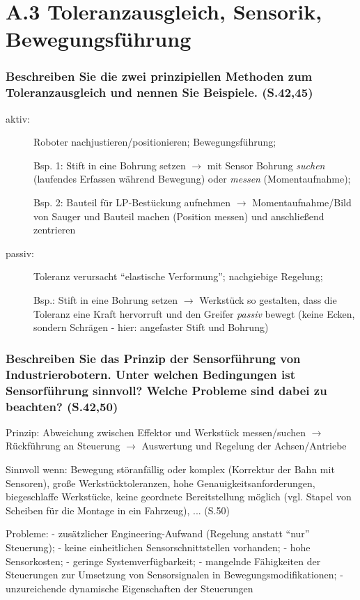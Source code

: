 \section{A.3 Toleranzausgleich, Sensorik, Bewegungsführung}

\subsubsection*{Beschreiben Sie die zwei prinzipiellen Methoden zum Toleranzausgleich und 
  nennen Sie Beispiele. (S.42,45)}
\begin{description}
\item[aktiv:] Roboter nachjustieren/positionieren; Bewegungsführung; 

  Bsp. 1: Stift in eine
  Bohrung setzen $\rightarrow$ mit Sensor Bohrung \emph{suchen} (laufendes Erfassen während 
  Bewegung) oder \emph{messen} (Momentaufnahme); 

  Bsp. 2: Bauteil für LP-Bestückung aufnehmen
  $\rightarrow$ Momentaufnahme/Bild von Sauger und Bauteil machen (Position messen) und 
  anschließend zentrieren
\item[passiv:] Toleranz verursacht ``elastische Verformung''; nachgiebige Regelung; 

  Bsp.: Stift in eine Bohrung
  setzen $\rightarrow$ Werkstück so gestalten, dass die Toleranz eine Kraft hervorruft und 
  den Greifer \emph{passiv} bewegt (keine Ecken, sondern Schrägen - hier: angefaster Stift
  und Bohrung)
\end{description}

\subsubsection*{Beschreiben Sie das Prinzip der Sensorführung von Industrierobotern. Unter
  welchen Bedingungen ist Sensorführung sinnvoll? Welche Probleme sind dabei zu beachten? 
  (S.42,50)}
Prinzip: Abweichung zwischen Effektor und Werkstück messen/suchen $\rightarrow$ Rückführung
an Steuerung $\rightarrow$ Auswertung und Regelung der Achsen/Antriebe

Sinnvoll wenn: Bewegung störanfällig oder komplex (Korrektur der Bahn mit Sensoren), 
große Werkstücktoleranzen, hohe Genauigkeitsanforderungen, biegeschlaffe Werkstücke, 
keine geordnete Bereitstellung möglich (vgl. Stapel von Scheiben für die Montage in ein
Fahrzeug), ... (S.50)

Probleme: - zusätzlicher Engineering-Aufwand (Regelung anstatt ``nur'' Steuerung); - keine
einheitlichen Sensorschnittstellen vorhanden; - hohe Sensorkosten; - geringe 
Systemverfügbarkeit; - mangelnde Fähigkeiten der Steuerungen zur Umsetzung von
Sensorsignalen in Bewegungsmodifikationen; - unzureichende dynamische Eigenschaften der 
Steuerungen
